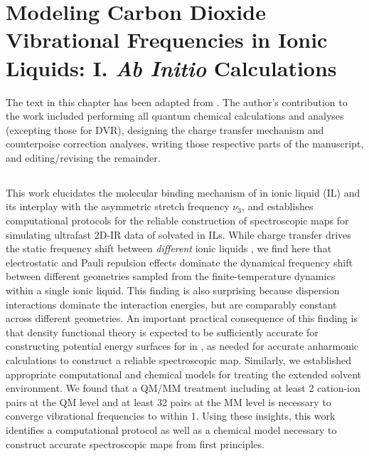 \documentclass[%
  class = book,%
  crop = false,%
  float = true,%
  multi = true,%
  preview = false,%
]{standalone}
\begin{document}
\chapter[\texorpdfstring{\ce{CO2}}{CO2}-IL Cluster Model Validation]{Modeling Carbon Dioxide Vibrational Frequencies in Ionic Liquids: I. \textit{Ab Initio} Calculations}
\label{ch:paper_02}

The text in this chapter has been adapted from . The author's contribution to the work included performing all quantum chemical calculations and analyses (excepting those for DVR), designing the charge transfer mechanism and counterpoise correction analyses, writing those respective parts of the manuscript, and editing/revising the remainder.

\section{\texorpdfstring{}{Summary}}
\label{paper_02:sec:summary}

This work elucidates the molecular binding mechanism of  in \ce{[C4C1im][PF6]} ionic liquid (IL) and its interplay with the  asymmetric stretch frequency \(\nu_{3}\), and establishes computational protocols for the reliable construction of spectroscopic maps for simulating ultrafast 2D-IR data of  solvated in ILs. While charge transfer drives the static frequency shift between \emph{different} ionic liquids \parencite{Brinzer2015}, we find here that electrostatic and Pauli repulsion effects dominate the dynamical frequency shift between different geometries sampled from the finite-temperature dynamics within a single ionic liquid. This finding is also surprising because dispersion interactions dominate the \cotil interaction energies, but are comparably constant across different geometries. An important practical consequence of this finding is that density functional theory is expected to be sufficiently accurate for constructing potential energy surfaces for  in \ce{[C4C1im][PF6]}, as needed for accurate anharmonic calculations to construct a reliable spectroscopic map. Similarly, we established appropriate computational and chemical models for treating the extended solvent environment. We found that a QM/MM treatment including at least \num{2} cation-ion pairs at the QM level and at least \num{32} pairs at the MM level is necessary to converge vibrational frequencies to within \SI{1}{\wavenumber}. Using these insights, this work identifies a computational protocol as well as a chemical model necessary to construct accurate spectroscopic maps from first principles.
\end{document}
